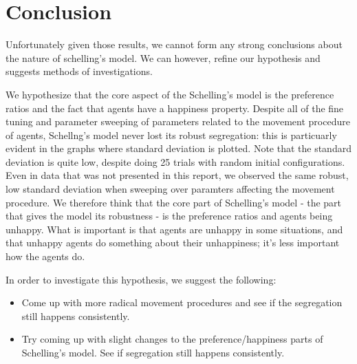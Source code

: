 \documentclass[11pt,twoside]{amsart}
\theoremstyle{theorem}
\theoremstyle{definition}
\theoremstyle{remark}
\begin{document}

\section{Conclusion}
Unfortunately given those results, we cannot form any strong conclusions about the nature of schelling's model.
We can however, refine our hypothesis and suggests methods of investigations.

We hypothesize that the core aspect of the Schelling's model is the preference ratios and the fact that agents have a happiness property.
Despite all of the fine tuning and parameter sweeping of parameters related to the movement procedure of agents, Schellng's model never lost its robust segregation: this is particuarly evident in the graphs where standard deviation is plotted. 
Note that the standard deviation is quite low, despite doing 25 trials with random initial configurations. 
Even in data that was not presented in this report, we observed the same robust, low standard deviation when sweeping over paramters affecting the movement procedure. 
We therefore think that the core part of Schelling's model - the part that gives the model its robustness - is the preference ratios and agents being unhappy. 
What is important is that agents are unhappy in some situations, and that unhappy agents do something about their unhappiness; it's less important how the agents do.

In order to investigate this hypothesis, we suggest the following:
\begin{itemize}
    \item Come up with more radical movement procedures and see if the segregation still happens consistently.
    \item Try coming up with slight changes to the preference/happiness parts of Schelling's model. See if segregation still happens consistently.
\end{itemize}
\end{document}
